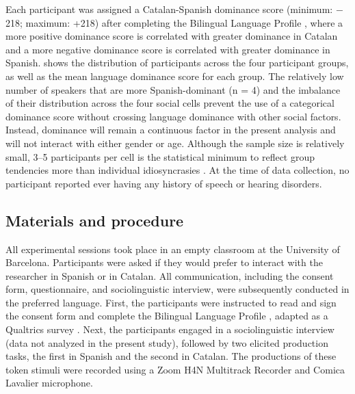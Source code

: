\documentclass[output=paper,colorlinks,citecolor=brown,draftmode]{langscibook}
\begin{document}
    Each participant was assigned a Catalan-Spanish dominance score (minimum: $-$218; maximum: +218) after completing the Bilingual Language Profile \citep{birdsong2012bilingual}, where a more positive dominance score is correlated with greater dominance in Catalan and a more negative dominance score is correlated with greater dominance in Spanish.  shows the distribution of participants across the four participant groups, as well as the mean language dominance score for each group. The relatively low number of speakers that are more Spanish-dominant (n = 4) and the imbalance of their distribution across the four social cells prevent the use of a categorical dominance score without crossing language dominance with other social factors. Instead, dominance will remain a continuous factor in the present analysis and will not interact with either gender or age. Although the sample size is relatively small, 3--5 participants per cell is the statistical minimum to reflect group tendencies more than individual idiosyncrasies \citep[][31]{tagliamonte2006analysing}. At the time of data collection, no participant reported ever having any history of speech or hearing disorders.

\subsection{Materials and procedure}
\largerpage
	All experimental sessions took place in an empty classroom at the University of Barcelona. Participants were asked if they would prefer to interact with the researcher in Spanish or in Catalan. All communication, including the consent form, questionnaire, and  sociolinguistic interview, were subsequently conducted in the preferred language. First, the participants were instructed to read and sign the consent form and complete the Bilingual Language Profile \citep{birdsong2012bilingual}, adapted as a Qualtrics survey \citep{qualtrics2005qualtrics}. Next, the participants engaged in a sociolinguistic interview (data not analyzed in the present study), followed by two elicited production tasks, the first in Spanish and the second in Catalan. The productions of these token stimuli were recorded using a Zoom H4N Multitrack Recorder and Comica Lavalier microphone.
\end{document}
